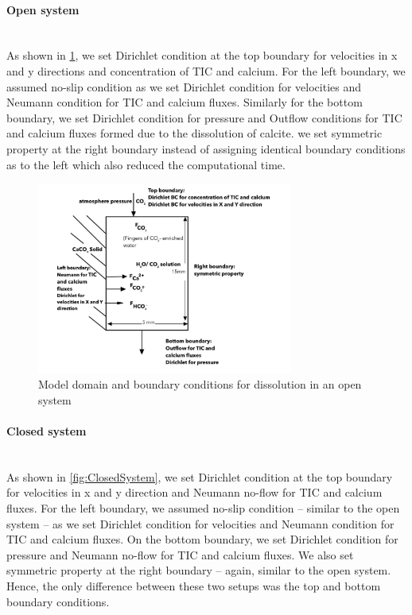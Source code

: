 \paragraph*{Open system} \mbox{} \\

As shown in \cref{fig:OpenedSystem}, we set Dirichlet condition at the top boundary for velocities in x and y directions 
and concentration of TIC and calcium. For the left boundary, we assumed no-slip condition as we set Dirichlet condition for 
velocities and Neumann condition for TIC and calcium fluxes. Similarly for the bottom boundary, we set Dirichlet condition 
for pressure and Outflow conditions for TIC and calcium fluxes formed due to the dissolution of calcite. we set symmetric property 
at the right boundary instead of assigning identical boundary conditions as to the left which also reduced the computational time.

\begin{figure}
    \centering
    \includegraphics[width=0.75\textwidth]{PICTURES/opened_system.jpg}
    \caption{Model domain and boundary conditions for  dissolution in an open system}
    \label{fig:OpenedSystem}       %
\end{figure}


\paragraph*{Closed system} \mbox{} \\
As shown in \cref{fig:ClosedSystem}, we set Dirichlet condition at the top boundary for velocities in x and y direction and 
Neumann no-flow for TIC and calcium fluxes. For the left boundary, we assumed no-slip condition -- similar 
to the open system -- as we set Dirichlet condition for velocities and Neumann condition for TIC and calcium fluxes. On the 
bottom boundary, we set Dirichlet condition for pressure and Neumann no-flow for TIC and calcium fluxes. 
We also set symmetric property at the right boundary -- again, similar to the open system. Hence, the only difference between 
these two setups was the top and bottom boundary conditions. 

